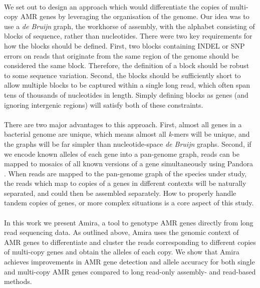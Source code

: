 \paragraph{}
We set out to design an approach which would differentiate the copies of multi-copy AMR genes by leveraging the organisation of the genome. Our idea was to use a \textit{de Bruijn} graph, the workhorse of assembly, with the alphabet consisting of blocks of sequence, rather than nucleotides. There were two key requirements for how the blocks should be defined. First, two blocks containing INDEL or SNP errors on reads that originate from the same region of the genome should be considered the same block. Therefore, the definition of a block should be robust to some sequence variation. Second, the blocks should be sufficiently short to allow multiple blocks to be captured within a single long read, which often span tens of thousands of nucleotides in length. Simply defining blocks as genes (and ignoring intergenic regions) will satisfy both of these constraints.
\paragraph{}
There are two major advantages to this approach. First, almost all genes in a bacterial genome are unique, which means almost all \textit{k}-mers will be unique, and the graphs will be far simpler than nucleotide-space \textit{de Bruijn} graphs. Second, if we encode known alleles of each gene into a pan-genome graph, reads can be mapped to mosaics of all known versions of a gene simultaneously using Pandora \cite{pandora}. When reads are mapped to the pan-genome graph of the species under study, the reads which map to copies of a genes in different contexts will be naturally separated, and could then be assembled separately. How to properly handle tandem copies of genes, or more complex situations is a core aspect of this study. 
\paragraph{}
In this work we present Amira, a tool to genotype AMR genes directly from long read sequencing data. As outlined above, Amira uses the genomic context of AMR genes to differentiate and cluster the reads corresponding to different copies of multi-copy genes and obtain the alleles of each copy. We show that Amira achieves improvements in AMR gene detection and allele accuracy for both single and multi-copy AMR genes compared to long read-only assembly- and read-based methods. 

